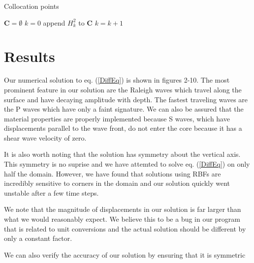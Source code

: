 \documentclass[12pt]{article}
\begin{document}
\begin{algorithm}[h!]
\caption{Collocation points}
\begin{algorithmic}
\STATE $\boldsymbol{C} = \emptyset$
\STATE $k = 0$
    \STATE append $H^2_k$ to $\boldsymbol{C}$
  \ENDIF
  \STATE $k = k + 1$  
\ENDWHILE
\end{algorithmic}
\end{algorithm}
\section*{Results}
Our numerical solution to eq. (\ref{DiffEq}) is shown in figures 2-10.
The most prominent feature in our solution are the Raleigh waves which
travel along the surface and have decaying amplitude with depth.  The
fastest traveling waves are the P waves which have only a faint
signature.  We can also be assured that the material properties are
properly implemented because S waves, which have displacements
parallel to the wave front, do not enter the core because it has a
shear wave velocity of zero.

It is also worth noting that the solution has symmetry about the
vertical axis.  This symmetry is no suprise and we have attemted to
solve eq. (\ref{DiffEq}) on only half the domain.  However, we have
found that solutions using RBFs are incredibly sensitive to corners in
the domain and our solution quickly went unstable after a few time
steps.

We note that the magnitude of displacements in our solution is far
larger than what we would reasonably expect.  We believe this to be a
bug in our program that is related to unit conversions and the actual
solution should be different by only a constant factor.

We can also verify the accuracy of our solution by ensuring that it is 
symmetric
\end{document}
